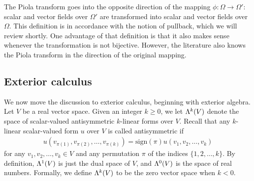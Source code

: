 \documentclass[10pt,a4paper]{article}
\newcommand\cye[1]{%
\protect\leavevmode
\begingroup
    \color{blue}%
    #1%
\endgroup
}
\begin{document}
\begin{remark}
    The Piola transform goes into the opposite direction of the mapping $\phi : \Omega \rightarrow \Omega'$:
    scalar and vector fields over $\Omega'$ are transformed into scalar and vector fields over $\Omega$.
    This definition is in accordance with the notion of pullback, which we will review shortly. 
    One advantage of that definition is that it also makes sense whenever the transformation is not bijective. 
    However, the literature also knows the Piola transform in the direction of the original mapping. 
\end{remark}


\subsection{Exterior calculus}


We now move the discussion to exterior calculus, beginning with exterior algebra.
Let $V$ be a real vector space. 
Given an integer $k \geq 0$, we let $\Lambda^{k}(V)$ denote the space of scalar-valued antisymmetric $k$-linear forms over $V$. 
Recall that any $k$-linear scalar-valued form $u$ over $V$ is called antisymmetric
if 
\begin{gather*} 
    u( v_{\pi(1)}, v_{\pi(2)}, \ldots, v_{\pi(k)} ) 
    = 
    \text{sign}(\pi) 
    u( v_1, v_2, \ldots, v_k ) 
\end{gather*}
for any $v_1, v_2, \dots, v_k \in V$ and any permutation $\pi$ of the indices \(\{1, 2, \ldots, k\}\). 
By definition, $\Lambda^{1}(V)$ is just the dual space of $V$, and $\Lambda^{0}(V)$ is the space of real numbers. 
Formally, we define $\Lambda^{k}(V)$ to be the zero vector space when $k < 0$. 
\end{document}
